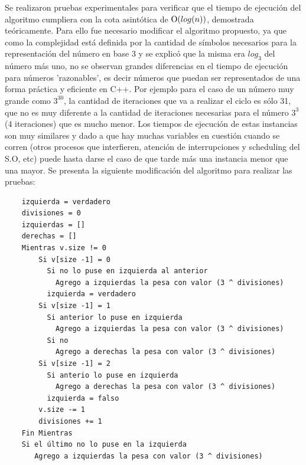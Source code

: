 	Se realizaron pruebas experimentales para verificar que el tiempo de
	ejecución del algoritmo cumpliera con la cota asintótica de $\operatorname{O}(log(n))$,
	demostrada teóricamente. Para ello fue necesario modificar el algoritmo propuesto, ya que como la complejidad está definida por la cantidad de símbolos necesarios para la representación del número en base 3 y se explicó que la misma era $log_3$ del número más uno, no se observan grandes diferencias en el tiempo de ejecución para números 'razonables', es decir números que puedan ser representados de una forma práctica y eficiente en C++. Por ejemplo para el caso de un número muy grande como $3^{30}$, la cantidad de iteraciones que va a realizar el ciclo es sólo 31, que no es muy diferente a la cantidad de iteraciones necesarias para el número $3^{3}$ (4 iteraciones) que es mucho menor. Los tiempos de ejecución de estas instancias son muy similares y dado a que hay muchas variables en cuestión cuando se corren (otros procesos que interfieren, atención de interrupciones y scheduling del S.O, etc) puede hasta darse el caso de que tarde más una instancia menor que una mayor. Se presenta la siguiente modificación del algoritmo para realizar las pruebas:

	\begin{codesnippet}
	\begin{verbatim}
	izquierda = verdadero
	divisiones = 0
	izquierdas = []
	derechas = []
	Mientras v.size != 0
	    Si v[size -1] = 0
	      Si no lo puse en izquierda al anterior
	        Agrego a izquierdas la pesa con valor (3 ^ divisiones)
	      izquierda = verdadero
	    Si v[size -1] = 1
	      Si anterior lo puse en izquierda
	        Agrego a izquierdas la pesa con valor (3 ^ divisiones)
	      Si no
	        Agrego a derechas la pesa con valor (3 ^ divisiones)
	    Si v[size -1] = 2
	      Si anterio lo puse en izquierda
	        Agrego a derechas la pesa con valor (3 ^ divisiones)
	      izquierda = falso
	    v.size -= 1
	    divisiones += 1
	Fin Mientras
	Si el último no lo puse en la izquierda
	   Agrego a izquierdas la pesa con valor (3 ^ divisiones)
	\end{verbatim}
	\end{codesnippet}

